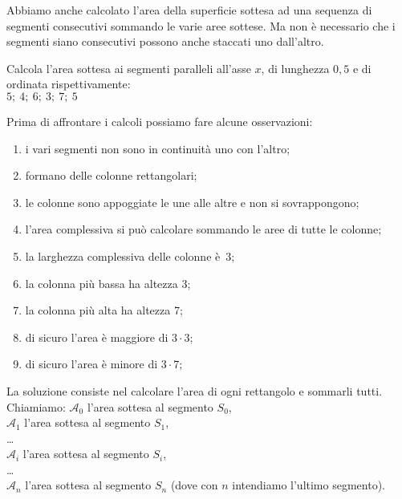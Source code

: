 Abbiamo anche calcolato l'area della superficie sottesa ad una sequenza di 
segmenti consecutivi sommando le varie aree sottese. Ma non è necessario che 
i segmenti siano consecutivi possono anche staccati uno dall'altro.

\begin{esempio}
Calcola l'area sottesa ai segmenti paralleli all'asse \(x\), di lunghezza 
\(0,5\) e di ordinata rispettivamente: \\ 
\(5;~4;~6;~3;~7;~5\)
\begin{minipage}{.29\textwidth}
\begin{inaccessibleblock}
  \areasottesasegmenti
\end{inaccessibleblock}
\end{minipage}
\hfill
\begin{minipage}{.69\textwidth}
Prima di affrontare i calcoli possiamo fare alcune osservazioni:
\begin{enumerate} [nosep]
 \item i vari segmenti non sono in continuità uno con l'altro;
 \item formano delle colonne rettangolari;
 \item le colonne sono appoggiate le une alle altre e non si sovrappongono;
 \item l'area complessiva si può calcolare sommando le aree di tutte le 
colonne;
 \item la larghezza complessiva delle colonne è~3;
 \item la colonna più bassa ha altezza 3;
 \item la colonna più alta ha altezza 7;
 \item di sicuro l'area è maggiore di \(3 \cdot 3\);
 \item di sicuro l'area è minore di \(3 \cdot 7\);
\end{enumerate}
\end{minipage}
\end{esempio}

La soluzione consiste nel calcolare l'area di ogni rettangolo e sommarli 
tutti.
Chiamiamo:
\(\mathcal{A}_0\) l'area sottesa al segmento \(S_0\),\\
\(\mathcal{A}_1\) l'area sottesa al segmento \(S_1\),\\
\dots\\
\(\mathcal{A}_i\) l'area sottesa al segmento \(S_i\),\\
\dots\\
\(\mathcal{A}_n\) l'area sottesa al segmento \(S_n\)
\quad
(dove con \(n\) intendiamo l'ultimo segmento).\\

